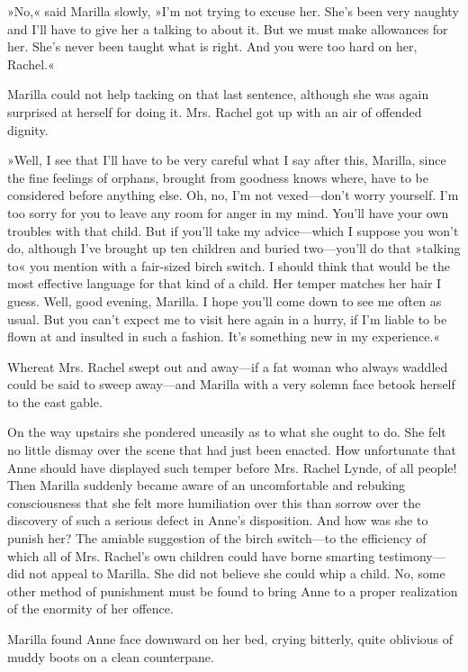 »No,« said Marilla slowly, »I'm not trying to excuse her. She's been very naughty and I'll have to give her a talking to about it. But we must make allowances for her. She's never been taught what is right. And you were too hard on her, Rachel.«

Marilla could not help tacking on that last sentence, although she was again surprised at herself for doing it. Mrs. Rachel got up with an air of offended dignity.

»Well, I see that I'll have to be very careful what I say after this, Marilla, since the fine feelings of orphans, brought from goodness knows where, have to be considered before anything else. Oh, no, I'm not vexed—don't worry yourself. I'm too sorry for you to leave any room for anger in my mind. You'll have your own troubles with that child. But if you'll take my advice—which I suppose you won't do, although I've brought up ten children and buried two—you'll do that »talking to« you mention with a fair-sized birch switch. I should think that would be the most effective language for that kind of a child. Her temper matches her hair I guess. Well, good evening, Marilla. I hope you'll come down to see me often as usual. But you can't expect me to visit here again in a hurry, if I'm liable to be flown at and insulted in such a fashion. It's something new in my experience.«

Whereat Mrs. Rachel swept out and away—if a fat woman who always waddled could be said to sweep away—and Marilla with a very solemn face betook herself to the east gable.

On the way upstairs she pondered uneasily as to what she ought to do. She felt no little dismay over the scene that had just been enacted. How unfortunate that Anne should have displayed such temper before Mrs. Rachel Lynde, of all people! Then Marilla suddenly became aware of an uncomfortable and rebuking consciousness that she felt more humiliation over this than sorrow over the discovery of such a serious defect in Anne's disposition. And how was she to punish her? The amiable suggestion of the birch switch—to the efficiency of which all of Mrs. Rachel's own children could have borne smarting testimony—did not appeal to Marilla. She did not believe she could whip a child. No, some other method of punishment must be found to bring Anne to a proper realization of the enormity of her offence.

Marilla found Anne face downward on her bed, crying bitterly, quite oblivious of muddy boots on a clean counterpane.

